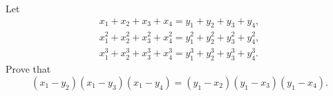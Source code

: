 \problem
Let
\begin{gather*}
    x_1 + x_2 + x_3 + x_4 = y_1 + y_2 + y_3 + y_4
,\\
    x_1^2 + x_2^2 + x_3^2 + x_4^2
=
    y_1^2 + y_2^2 + y_3^2 + y_4^2
,\\
    x_1^3 + x_2^3 + x_3^3 + x_4^3
=
    y_1^3 + y_2^3 + y_3^3 + y_4^3
.\end{gather*}
Prove that
\[
    (x_1 - y_2) (x_1 - y_3) (x_1 - y_4)
=
    (y_1 - x_2) (y_1 - x_3) (y_1 - x_4)
.\]

\solution

\endproblem
